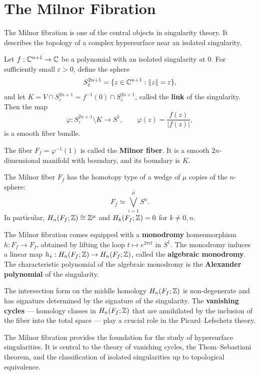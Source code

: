\section{The Milnor Fibration}

The Milnor fibration is one of the central objects in singularity theory. It describes the topology of a complex hypersurface near an isolated singularity.

\begin{theorem}
Let \(f: \mathbb{C}^{n+1} \to \mathbb{C}\) be a polynomial with an isolated singularity at 0. For sufficiently small \(\varepsilon > 0\), define the sphere
\[
S_\varepsilon^{2n+1} = \{z \in \mathbb{C}^{n+1} : \|z\| = \varepsilon\},
\]
and let \(K = V \cap S_\varepsilon^{2n+1} = f^{-1}(0) \cap S_\varepsilon^{2n+1}\), called the \textbf{link} of the singularity. Then the map
\[
\varphi: S_\varepsilon^{2n+1} \setminus K \longrightarrow S^1, \qquad
\varphi(z) = \frac{f(z)}{|f(z)|},
\]
is a smooth fiber bundle.
\end{theorem}

The fiber \(F_f = \varphi^{-1}(1)\) is called the \textbf{Milnor fiber}. It is a smooth \(2n\)-dimensional manifold with boundary, and its boundary is \(K\).

\begin{theorem}
The Milnor fiber \(F_f\) has the homotopy type of a wedge of \(\mu\) copies of the \(n\)-sphere:
\[
F_f \simeq \bigvee_{i=1}^\mu S^n.
\]
In particular, \(H_n(F_f; \mathbb{Z}) \cong \mathbb{Z}^\mu\) and \(H_k(F_f; \mathbb{Z}) = 0\) for \(k \neq 0,n\).
\end{theorem}

The Milnor fibration comes equipped with a \textbf{monodromy} homeomorphism \(h: F_f \to F_f\), obtained by lifting the loop \(t \mapsto e^{2\pi i t}\) in \(S^1\). The monodromy induces a linear map \(h_*: H_n(F_f; \mathbb{Z}) \to H_n(F_f; \mathbb{Z})\), called the \textbf{algebraic monodromy}. The characteristic polynomial of the algebraic monodromy is the \textbf{Alexander polynomial} of the singularity.

The intersection form on the middle homology \(H_n(F_f; \mathbb{Z})\) is non-degenerate and has signature determined by the signature of the singularity. The \textbf{vanishing cycles} --- homology classes in \(H_n(F_f; \mathbb{Z})\) that are annihilated by the inclusion of the fiber into the total space --- play a crucial role in the Picard--Lefschetz theory.

The Milnor fibration provides the foundation for the study of hypersurface singularities. It is central to the theory of vanishing cycles, the Thom--Sebastiani theorem, and the classification of isolated singularities up to topological equivalence.

